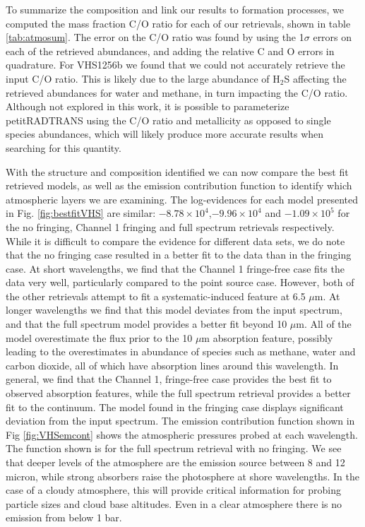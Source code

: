 To summarize the composition and link our results to formation processes, we computed the mass fraction C/O ratio for each of our retrievals, shown in table \ref{tab:atmosum}. 
The error on the C/O ratio was found by using the 1$\sigma$ errors on each of the retrieved abundances, and adding the relative C and O errors in quadrature.
For VHS1256b we found that we could not accurately retrieve the input C/O ratio. 
This is likely due to the large abundance of H$_{2}$S affecting the retrieved abundances for water and methane, in turn impacting the C/O ratio.
Although not explored in this work, it is possible to parameterize petitRADTRANS using the C/O ratio and metallicity as opposed to single species abundances, which will likely produce more accurate results when searching for this quantity.

With the structure and composition identified we can now compare the best fit retrieved models, as well as the emission contribution function to identify which atmospheric layers we are examining.
The log-evidences for each model presented in Fig. \ref{fig:bestfitVHS} are similar: $-8.78\times10^{4}$,$-9.96\times10^{4}$ and  $-1.09\times10^{5}$ for the no fringing, Channel 1 fringing and full spectrum retrievals respectively.
While it is difficult to compare the evidence for different data sets, we do note that the no fringing case resulted in a better fit to the data than in the fringing case. 
At short wavelengths, we find that the Channel 1 fringe-free case fits the data very well, particularly compared to the point source case.
However, both of the other retrievals attempt to fit a systematic-induced feature at 6.5 $\mu$m.
At longer wavelengths we find that this model deviates from the input spectrum, and that the full spectrum model provides a better fit beyond 10 $\mu$m.
All of the model overestimate the flux prior to the 10 $\mu$m absorption feature, possibly leading to the overestimates in abundance of species such as methane, water and carbon dioxide, all of which have absorption lines around this wavelength.
In general, we find that the Channel 1, fringe-free case provides the best fit to observed absorption features, while the full spectrum retrieval provides a better fit to the continuum. 
The model found in the fringing case displays significant deviation from the input spectrum.
The emission contribution function shown in Fig \ref{fig:VHSemcont} shows the atmospheric pressures probed at each wavelength. 
The function shown is for the full spectrum retrieval with no fringing.
We see that deeper levels of the atmosphere are the emission source between 8 and 12 micron, while strong absorbers raise the photosphere at shore wavelengths.
In the case of a cloudy atmosphere, this will provide critical information for probing particle sizes and cloud base altitudes.
Even in a clear atmosphere there is no emission from below 1 bar.

